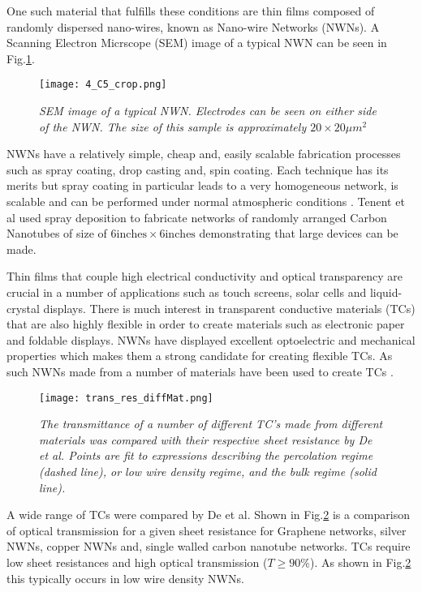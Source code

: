 One such material that fulfills these conditions are thin films composed of randomly dispersed nano-wires, known as Nano-wire Networks (NWNs). A Scanning Electron Micrscope (SEM) image of a typical NWN can be seen in Fig.\ref{fig:nwn_image}. 
\begin{figure}[ht!]
\centering
\texttt{[image: 4\_C5\_crop.png]}
\caption{\fontsize{10pt}{9pt}\selectfont \textit{SEM image of a typical NWN. Electrodes can be seen on either side of the NWN. The size of this sample is approximately $20 \times 20 \mu m^2$}}
\label{fig:nwn_image}
\end{figure}
NWNs have a relatively simple, cheap and, easily scalable fabrication processes such as spray coating\cite{rocha2015}, drop casting\cite{hardin2011} and, spin coating\cite{leem2011}. Each technique has its merits but spray coating in particular leads to a very homogeneous network, is scalable and can be performed under normal atmospheric conditions \cite{langley2013}. Tenent et al\cite{tenent2009} used spray deposition to fabricate networks of randomly arranged Carbon Nanotubes of size of $6 \text{inches} \times 6 \text{inches}$ demonstrating that large devices can be made.

Thin films that couple high electrical conductivity and optical transparency are crucial in a number of applications such as touch screens, solar cells and liquid-crystal displays. There is much interest in transparent conductive materials (TCs) that are also highly flexible in order to create materials such as electronic paper and foldable displays. NWNs have displayed excellent optoelectric and mechanical properties which makes them a strong candidate for creating flexible TCs. As such NWNs made from a number of materials have been used to create TCs \cite{madaria2010, sakunta2009,sukanta2011}. 

\begin{figure}[ht!]
\centering
\texttt{[image: trans\_res\_diffMat.png]}
\caption{\fontsize{10pt}{9pt}\selectfont \textit{The transmittance of a number of different TC's made from different materials was compared with their respective sheet resistance by De et al\cite{sukanta2011}. Points are fit to expressions describing the percolation regime (dashed line), or low wire density regime, and the bulk regime (solid line).}}
\label{fig:opt_prop}
\end{figure}
A wide range of TCs were compared by De et al\cite{sukanta2011}. Shown in Fig.\ref{fig:opt_prop} is a comparison of optical transmission for a given sheet resistance for Graphene networks, silver NWNs, copper NWNs and, single walled carbon nanotube networks. TCs require low sheet resistances and high optical transmission ($T \geq 90\%$). As shown in Fig.\ref{fig:opt_prop} this typically occurs in low wire density NWNs. 

